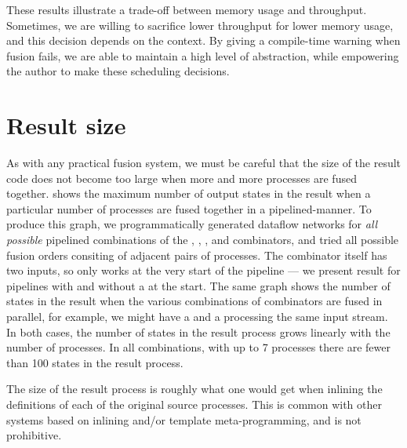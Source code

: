 These results illustrate a trade-off between memory usage and throughput.
Sometimes, we are willing to sacrifice lower throughput for lower memory usage, and this decision depends on the context.
By giving a compile-time warning when fusion fails, we are able to maintain a high level of abstraction, while empowering the author to make these scheduling decisions.

\section{Result size}

As with any practical fusion system, we must be careful that the size of the result code does not become too large when more and more processes are fused together.
 shows the maximum number of output states in the result when a particular number of processes are fused together in a pipelined-manner.
To produce this graph, we programmatically generated dataflow networks for \emph{all possible} pipelined combinations of the \Hs@map@, \Hs@filter@, \Hs@scan@, \Hs@group@ and \Hs@join@ combinators, and tried all possible fusion orders consiting of adjacent pairs of processes.
The \Hs@join@ combinator itself has two inputs, so only works at the very start of the pipeline --- we present result for pipelines with and without a \Hs@join@ at the start.
The same graph shows the number of states in the result when the various combinations of combinators are fused in parallel, for example, we might have a \Hs@map@ and a \Hs@filter@ processing the same input stream.
In both cases, the number of states in the result process grows linearly with the number of processes. In all combinations, with up to 7 processes there are fewer than 100 states in the result process. 




The size of the result process is roughly what one would get when inlining the definitions of each of the original source processes. This is common with other systems based on inlining and/or template meta-programming, and is not prohibitive.

